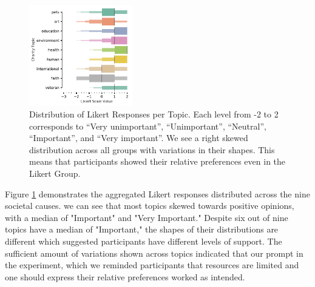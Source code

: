 
\begin{figure}[htpb]
    \centering
    \includegraphics[width=0.4\textwidth, keepaspectratio=true]{content/image/likert_distribution_per_topic.pdf}
    \caption{
      Distribution of Likert Responses per Topic. 
      Each level from -2 to 2 corresponds to 
      ``Very unimportant'', ``Unimportant'', ``Neutral'', ``Important'', and ``Very important''.
      We see a right skewed distribution across all groups with variations in their shapes.
      This means that participants showed their relative preferences even in the Likert Group.
    }
    \label{fig:likert_exp1}
\end{figure}


Figure \ref{fig:likert_exp1} demonstrates 
the aggregated Likert responses
distributed across the nine societal causes. 
we can see that most topics skewed towards positive opinions, 
with a median of "Important" and "Very Important." 
Despite six out of nine topics have a median of "Important," 
the shapes of their distributions are different which
suggested participants have different levels of support. 
The sufficient amount of variations 
shown across topics indicated that 
our prompt in the experiment, 
which we reminded participants that resources are limited
and one should express their relative preferences 
worked as intended. 

